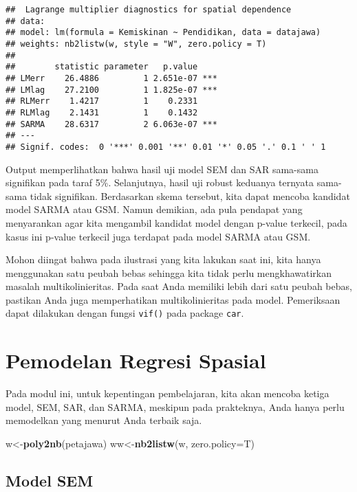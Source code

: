\documentclass[
]{book}
\newenvironment{Shaded}{\begin{snugshade}}{\end{snugshade}}
\newcommand{\DataTypeTok}[1]{\textcolor[rgb]{0.13,0.29,0.53}{#1}}
\newcommand{\KeywordTok}[1]{\textcolor[rgb]{0.13,0.29,0.53}{\textbf{#1}}}
\newcommand{\NormalTok}[1]{#1}
\begin{document}
\begin{verbatim}
##  Lagrange multiplier diagnostics for spatial dependence
## data:  
## model: lm(formula = Kemiskinan ~ Pendidikan, data = datajawa)
## weights: nb2listw(w, style = "W", zero.policy = T)
##  
##        statistic parameter   p.value    
## LMerr    26.4886         1 2.651e-07 ***
## LMlag    27.2100         1 1.825e-07 ***
## RLMerr    1.4217         1    0.2331    
## RLMlag    2.1431         1    0.1432    
## SARMA    28.6317         2 6.063e-07 ***
## ---
## Signif. codes:  0 '***' 0.001 '**' 0.01 '*' 0.05 '.' 0.1 ' ' 1
\end{verbatim}

Output memperlihatkan bahwa hasil uji model SEM dan SAR sama-sama signifikan pada taraf 5\%. Selanjutnya, hasil uji robust keduanya ternyata sama-sama tidak signifikan. Berdasarkan skema tersebut, kita dapat mencoba kandidat model SARMA atau GSM. Namun demikian, ada pula pendapat yang menyarankan agar kita mengambil kandidat model dengan p-value terkecil, pada kasus ini p-value terkecil juga terdapat pada model SARMA atau GSM.

Mohon diingat bahwa pada ilustrasi yang kita lakukan saat ini, kita hanya menggunakan satu peubah bebas sehingga kita tidak perlu mengkhawatirkan masalah multikolinieritas. Pada saat Anda memiliki lebih dari satu peubah bebas, pastikan Anda juga memperhatikan multikolinieritas pada model. Pemeriksaan dapat dilakukan dengan fungsi \texttt{vif()} pada package \texttt{car}.

\hypertarget{pemodelan-regresi-spasial}{%
\section{Pemodelan Regresi Spasial}\label{pemodelan-regresi-spasial}}

Pada modul ini, untuk kepentingan pembelajaran, kita akan mencoba ketiga model, SEM, SAR, dan SARMA, meskipun pada prakteknya, Anda hanya perlu memodelkan yang menurut Anda terbaik saja.

\begin{Shaded}
\begin{Highlighting}[]
\NormalTok{w\textless{}{-}}\KeywordTok{poly2nb}\NormalTok{(petajawa)}
\NormalTok{ww\textless{}{-}}\KeywordTok{nb2listw}\NormalTok{(w, }\DataTypeTok{zero.policy=}\NormalTok{T)}
\end{Highlighting}
\end{Shaded}

\hypertarget{model-sem}{%
\subsection{Model SEM}\label{model-sem}}
\end{document}
